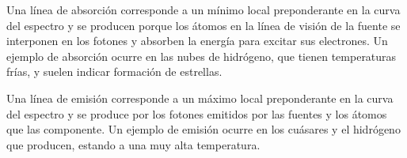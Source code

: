 Una línea de absorción corresponde a un mínimo local preponderante en la curva del espectro y se producen porque los átomos en la línea de visión de la fuente se interponen en los fotones y absorben la energía para excitar sus electrones. Un ejemplo de absorción ocurre en las nubes de hidrógeno, que tienen temperaturas frías, y suelen indicar formación de estrellas.

Una línea de emisión corresponde a un máximo local preponderante en la curva del espectro y se produce por los fotones emitidos por las fuentes y los átomos que las componente. Un ejemplo de emisión ocurre en los cuásares y el hidrógeno que producen, estando a una muy alta temperatura.